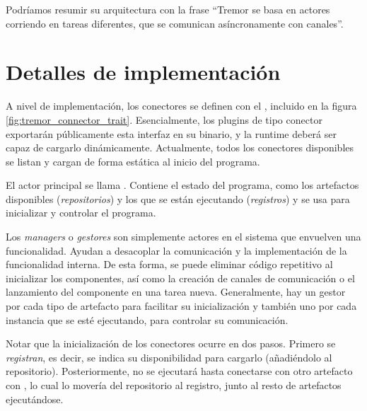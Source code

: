 Podríamos resumir su arquitectura con la frase ``Tremor se basa en actores
corriendo en tareas diferentes, que se comunican asíncronamente con canales''.

\section{Detalles de implementación}

A nivel de implementación, los conectores se definen con el \trait
{}, incluido en la figura \ref{fig:tremor_connector_trait}.
Esencialmente, los plugins de tipo conector exportarán públicamente esta
interfaz en su binario, y la runtime deberá ser capaz de cargarlo dinámicamente.
Actualmente, todos los conectores disponibles se listan y cargan de forma
estática al inicio del programa.

El actor principal se llama . Contiene el estado del programa, como
los artefactos disponibles (\emph{repositorios}) y los que se están ejecutando
(\emph{registros}) y se usa para inicializar y controlar el programa.

Los \emph{managers} o \emph{gestores} son simplemente actores en el sistema que
envuelven una funcionalidad. Ayudan a desacoplar la comunicación y la
implementación de la funcionalidad interna. De esta forma, se puede eliminar
código repetitivo al inicializar los componentes, así como la creación de
canales de comunicación o el lanzamiento del componente en una tarea nueva.
Generalmente, hay un gestor por cada tipo de artefacto para facilitar su
inicialización y también uno por cada instancia que se esté ejecutando, para
controlar su comunicación.

Notar que la inicialización de los conectores ocurre en dos pasos. Primero se
\emph{registran}, es decir, se indica su disponibilidad para cargarlo
(añadiéndolo al repositorio). Posteriormente, no se ejecutará hasta conectarse
con otro artefacto con , lo cual lo movería del repositorio
al registro, junto al resto de artefactos ejecutándose.

